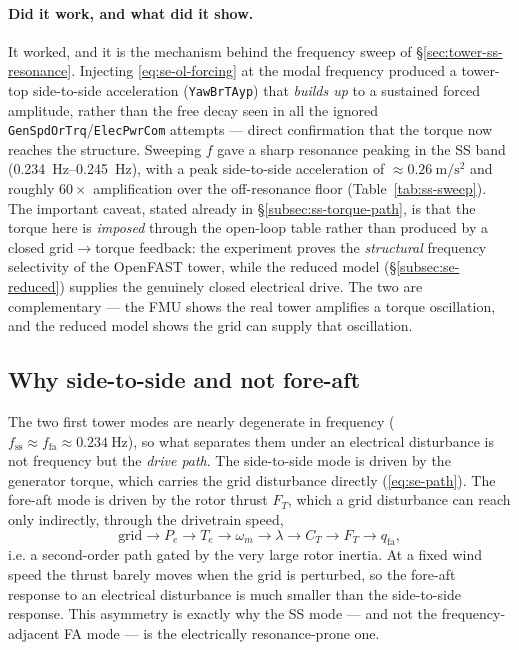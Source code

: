 \paragraph{Did it work, and what did it show.}
It worked, and it is the mechanism behind the frequency sweep of
\S\ref{sec:tower-ss-resonance}. Injecting \eqref{eq:se-ol-forcing} at the modal
frequency produced a tower-top side-to-side acceleration (\texttt{YawBrTAyp})
that \emph{builds up} to a sustained forced amplitude, rather than the free decay
seen in all the ignored \texttt{GenSpdOrTrq}/\texttt{ElecPwrCom} attempts ---
direct confirmation that the torque now reaches the structure. Sweeping \(f\)
gave a sharp resonance peaking in the SS band
(\SIrange{0.234}{0.245}{\hertz}), with a peak side-to-side acceleration of
\(\approx\SI{0.26}{\metre\per\second\squared}\) and roughly \(60\times\)
amplification over the off-resonance floor (Table~\ref{tab:ss-sweep}). The
important caveat, stated already in \S\ref{subsec:ss-torque-path}, is that the
torque here is \emph{imposed} through the open-loop table rather than produced by
a closed grid\(\to\)torque feedback: the experiment proves the \emph{structural}
frequency selectivity of the OpenFAST tower, while the reduced model
(\S\ref{subsec:se-reduced}) supplies the genuinely closed electrical drive. The
two are complementary --- the FMU shows the real tower amplifies a torque
oscillation, and the reduced model shows the grid can supply that oscillation.

\subsection{Why side-to-side and not fore-aft}
\label{subsec:se-selectivity}

The two first tower modes are nearly degenerate in frequency
(\(f_{\mathrm{ss}}\approx f_{\mathrm{fa}}\approx\SI{0.234}{\hertz}\)), so what
separates them under an electrical disturbance is not frequency but the
\emph{drive path}. The side-to-side mode is driven by the generator torque, which
carries the grid disturbance directly (\eqref{eq:se-path}). The fore-aft mode is
driven by the rotor thrust \(F_T\), which a grid disturbance can reach only
indirectly, through the drivetrain speed,
\begin{equation}
  \text{grid}\to P_e\to T_e\to \omega_m\to \lambda\to C_T\to F_T
  \to q_{\mathrm{fa}},
  \label{eq:se-fa-path}
\end{equation}
i.e. a second-order path gated by the very large rotor inertia. At a fixed wind
speed the thrust barely moves when the grid is perturbed, so the fore-aft
response to an electrical disturbance is much smaller than the side-to-side
response. This asymmetry is exactly why the SS mode --- and not the frequency-
adjacent FA mode --- is the electrically resonance-prone one.

